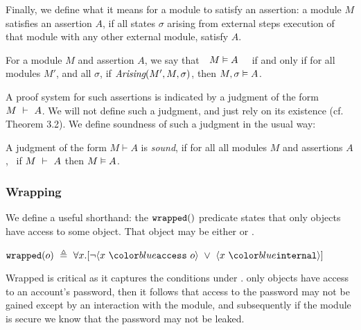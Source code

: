  
Finally, we define what it means for a module to satisfy an assertion:
a module $M$ satisfies an assertion $A$, if all states $\sigma$
arising from external steps execution of that
module with any other external module, satisfy $A$. 
 
\begin{definition} 
\label{def:mdl-sat}
For a module $M$ and assertion $A$, we say that\ \  $M \vDash A$ \ \ if and only if 
for all modules $M'$, and all $\sigma$, if $\textit{Arising}(M', M, \sigma)$, then $M , \sigma \vDash A$.
\end{definition}



A proof system for such assertions is indicated by a judgment of the form $M\ \vdash\ A$. 
We will not define such a judgment, and just rely on its existence (cf. Theorem 3.2).
We define soundness of such a judgment in the usual way:

\begin{definition}
\label{ax:specW-prove-soundness}
A judgment of the form $M \vdash A$ is \emph{sound}, if for all
  all modules $M$ and assertions $A$, \ if $M\ \vdash\ A$ then $M \vDash A$.
\end{definition}

\subsubsection{Wrapping}

We define a useful shorthand: the $\texttt{wrapped}(  )$ predicate  states 
that only \internalO objects have access to some object.
That object may be either \internalO or \externalO.
\begin{definition}[Wrapped]
$\wrapped{o}\ \triangleq\ \all{x}{\neg \access{x}{o}\ \vee\ \internal{x}}$
\end{definition}
Wrapped is critical as it captures the conditions under . 
 only \internalO
objects have access to an account's password, then
it follows that access to the password may not 
be gained except by an interaction with the \internalM
module, and subsequently if the \internalM module
is secure we know that the password may not be leaked.
 
